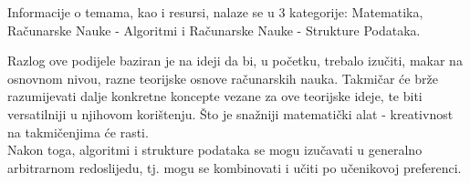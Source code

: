 \hspace{2em}Informacije o temama, kao i resursi, nalaze se u 3 kategorije: Matematika, Računarske Nauke - Algoritmi i Računarske Nauke - Strukture Podataka.

Razlog ove podijele baziran je na ideji da bi, u početku, trebalo izučiti, makar na osnovnom nivou, razne teorijske osnove računarskih nauka. Takmičar će brže razumijevati dalje konkretne koncepte vezane za ove teorijske ideje, te biti versatilniji u njihovom korištenju. Što je snažniji matematički alat - kreativnost na takmičenjima će rasti. \\
Nakon toga, algoritmi i strukture podataka se mogu izučavati u generalno arbitrarnom redoslijedu, tj. mogu se kombinovati i učiti po učenikovoj preferenci.